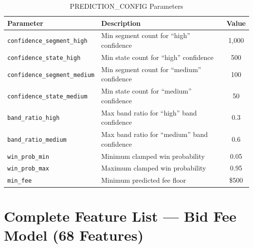 \documentclass[12pt,a4paper]{article}
\begin{document}
\begin{table}[H]
\centering
\caption{PREDICTION\_CONFIG Parameters}
\label{tab:pred-config}
\begin{tabular}{llc}
\toprule
\textbf{Parameter} & \textbf{Description} & \textbf{Value} \\
\midrule
\texttt{confidence\_segment\_high} & Min segment count for ``high'' confidence & 1,000 \\
\texttt{confidence\_state\_high} & Min state count for ``high'' confidence & 500 \\
\texttt{confidence\_segment\_medium} & Min segment count for ``medium'' confidence & 100 \\
\texttt{confidence\_state\_medium} & Min state count for ``medium'' confidence & 50 \\
\texttt{band\_ratio\_high} & Max band ratio for ``high'' band confidence & 0.3 \\
\texttt{band\_ratio\_medium} & Max band ratio for ``medium'' band confidence & 0.6 \\
\texttt{win\_prob\_min} & Minimum clamped win probability & 0.05 \\
\texttt{win\_prob\_max} & Maximum clamped win probability & 0.95 \\
\texttt{min\_fee} & Minimum predicted fee floor & \$500 \\
\bottomrule
\end{tabular}
\end{table}

\section{Complete Feature List --- Bid Fee Model (68 Features)}
\end{document}
